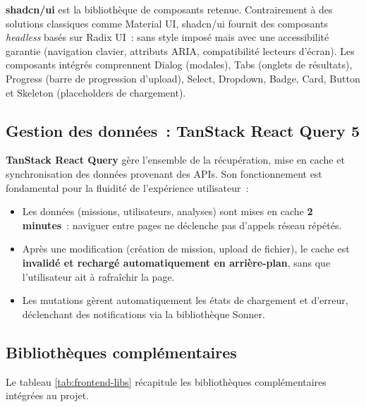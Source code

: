 \textbf{shadcn/ui} est la bibliothèque de composants retenue. Contrairement à des solutions classiques comme Material UI, shadcn/ui fournit des composants \textit{headless} basés sur Radix UI~: sans style imposé mais avec une accessibilité garantie (navigation clavier, attributs ARIA, compatibilité lecteurs d'écran). Les composants intégrés comprennent Dialog (modales), Tabs (onglets de résultats), Progress (barre de progression d'upload), Select, Dropdown, Badge, Card, Button et Skeleton (placeholders de chargement).

\subsection{Gestion des données~: TanStack React Query 5}

\textbf{TanStack React Query} gère l'ensemble de la récupération, mise en cache et synchronisation des données provenant des APIs. Son fonctionnement est fondamental pour la fluidité de l'expérience utilisateur~:

\begin{itemize}[leftmargin=1.5em]
  \item Les données (missions, utilisateurs, analyses) sont mises en cache \textbf{2 minutes}~: naviguer entre pages ne déclenche pas d'appels réseau répétés.
  \item Après une modification (création de mission, upload de fichier), le cache est \textbf{invalidé et rechargé automatiquement en arrière-plan}, sans que l'utilisateur ait à rafraîchir la page.
  \item Les mutations gèrent automatiquement les états de chargement et d'erreur, déclenchant des notifications via la bibliothèque Sonner.
\end{itemize}

\subsection{Bibliothèques complémentaires}

Le tableau \ref{tab:frontend-libs} récapitule les bibliothèques complémentaires intégrées au projet.

